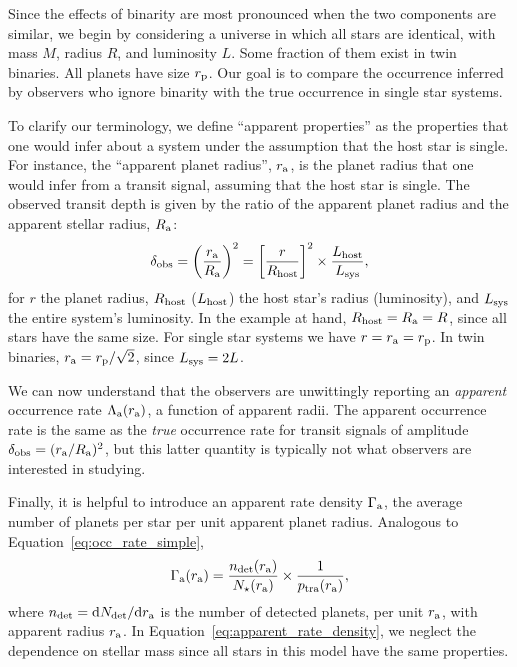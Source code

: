\documentclass[12pt,modern]{aastex61}
\renewcommand{\a}{_{\rm a}}
\newcommand{\p}{_{\rm p}}
\begin{document}
Since the effects of binarity are most pronounced when the two
components are similar, we begin by considering a universe in which
all stars are identical, with mass $M$, radius $R$, and luminosity
$L$.  Some fraction of them exist in twin binaries.  All planets have
size $r\p$.  Our goal is to compare the occurrence inferred by
observers who ignore binarity with the true occurrence in single star
systems.

To clarify our terminology, we define ``apparent properties'' as the 
properties that one would infer about a system under the assumption that the 
host star is single. For instance, the  ``apparent planet radius'', $r\a$, is
the planet radius that one would infer from a transit signal, 
assuming that the host star is single.
The observed transit depth is given by the ratio of the apparent planet
radius and the apparent stellar radius, $R\a$:
\begin{equation}
\delta_{\rm obs}
= \left(\frac{r\a}{R\a}\right)^2
= \left[{r\over R_{\rm host}}\right]^2\times {L_{\rm host} \over L_{\rm 
        sys}},
\label{eq:delta_obs_general} 
\end{equation}
for $r$ the planet radius, $R_{\rm host}$ ($L_{\rm host}$) the 
host star's radius (luminosity), and $L_{\rm sys}$ the 
entire system's luminosity.
In the example at hand, $R_{\rm host} =R\a = R$, since all stars have the same 
size. For single star systems we have $r=r\a=r\p$. In twin binaries, 
$r\a=r\p/\sqrt{2}$, since $L_{\rm sys}=2L$.

We can now understand that the observers are unwittingly reporting an
{\it apparent} occurrence rate $\Lambda\a(r\a)$, a function of
apparent radii.  The apparent occurrence rate is the same as the {\it
true} occurrence rate for transit signals of amplitude $\delta_{\rm
obs} = (r\a/R\a)^2$, but this latter quantity is typically not what
observers are interested in studying.

Finally, it is helpful to introduce an apparent rate density 
$\Gamma\a$, the average number of planets per star per unit apparent planet 
radius. Analogous to Equation~\ref{eq:occ_rate_simple},  
\begin{equation}
\Gamma\a(r\a) = \frac{n_{\rm det}(r\a)}{N_\star(r\a)}
\times \frac{1}{p_{\rm tra}(r\a)},
\label{eq:apparent_rate_density}
\end{equation}
where $n_{\rm det}={\rm d}N_{\rm det}/{\rm d}r\a$ is the number  
of detected planets, per unit $r\a$, with apparent radius $r\a$.
In Equation~\ref{eq:apparent_rate_density}, we neglect the dependence on 
stellar mass since all stars in this model have the same properties.
\end{document}
